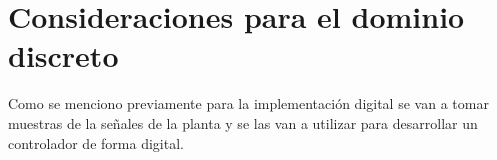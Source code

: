 %
%
%
%
%


\section{Consideraciones para el dominio discreto}

Como se menciono previamente para la implementación digital se van a tomar muestras de la señales de la planta y se las van a utilizar para desarrollar un controlador de forma digital. 

